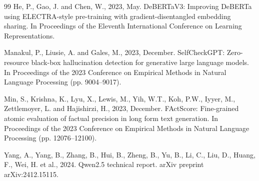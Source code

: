 \documentclass[conference]{IEEEtran}
\begin{document}
\begin{thebibliography}{99}
He, P., Gao, J. and Chen, W., 2023, May. DeBERTaV3: Improving DeBERTa using ELECTRA-style pre-training with
gradient-disentangled embedding sharing. In Proceedings of the Eleventh International Conference on Learning
Representations.

Manakul, P., Liusie, A. and Gales, M., 2023, December. SelfCheckGPT: Zero-resource black-box hallucination detection for
generative large language models. In Proceedings of the 2023 Conference on Empirical Methods in Natural Language
Processing (pp. 9004--9017).

Min, S., Krishna, K., Lyu, X., Lewis, M., Yih, W.T., Koh, P.W., Iyyer, M., Zettlemoyer, L. and Hajishirzi, H., 2023,
December. FActScore: Fine-grained atomic evaluation of factual precision in long form text generation. In Proceedings of
the 2023 Conference on Empirical Methods in Natural Language Processing (pp. 12076--12100).

Yang, A., Yang, B., Zhang, B., Hui, B., Zheng, B., Yu, B., Li, C., Liu, D., Huang, F., Wei, H. et al., 2024. Qwen2.5
technical report. arXiv preprint arXiv:2412.15115.

\end{thebibliography}
\end{document}
